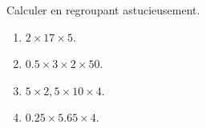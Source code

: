 \begin{exercice*}
   Calculer en regroupant astucieusement.
   \begin{multicols}{2}
      \begin{enumerate}
         \item $2\times17\times5$.
         \item $\num{0.5}\times3\times2\times50$.
         \item $5\times2,5\times10\times 4$.
         \item $\num{0.25}\times\num{5.65}\times4$.
      \end{enumerate}
   \end{multicols}
\end{exercice*}
